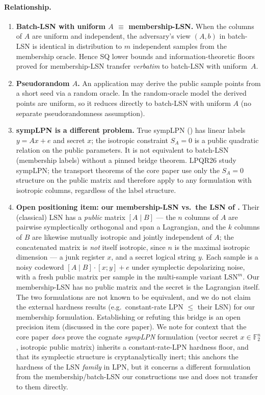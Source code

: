 \documentclass[11pt,a4paper]{article}
\theoremstyle{plain}
\theoremstyle{definition}
\newcommand{\F}{\mathbb{F}}
\begin{document}
\paragraph{Relationship.}
\begin{enumerate}
\item \textbf{Batch-LSN with uniform $A$ $\equiv$ membership-LSN.} When the columns of $A$ are uniform and independent, the adversary's view $(A,b)$ in batch-LSN is identical in distribution to $m$ independent samples from the membership oracle. Hence SQ lower bounds and information-theoretic floors proved for membership-LSN transfer \emph{verbatim} to batch-LSN with uniform~$A$.
\item \textbf{Pseudorandom $A$.} An application may derive the public sample points from a short seed via a random oracle. In the random-oracle model the derived points are uniform, so it reduces directly to batch-LSN with uniform $A$ (no separate pseudorandomness assumption).
\item \textbf{sympLPN is a different problem.} True sympLPN () has linear labels $y = Ax + e$ and secret $x$; the isotropic constraint $S_A = 0$ is a public quadratic relation on the public parameters. It is not equivalent to batch-LSN (membership labels) without a pinned bridge theorem. LPQR26 study sympLPN; the transport theorems of the core paper use only the $S_A = 0$ structure on the public matrix and therefore apply to any formulation with isotropic columns, regardless of the label structure.
\item \textbf{Open positioning item: our membership-LSN vs.\ \linebreak[0] the LSN of \cite{KLP+25,LPQR26}.} Their (classical) LSN has a \emph{public} matrix $[A \mid B]$ --- the $n$ columns of $A$ are pairwise symplectically orthogonal and span a Lagrangian, and the $k$ columns of $B$ are likewise mutually isotropic and jointly independent of $A$; the concatenated matrix is \emph{not} itself isotropic, since $n$ is the maximal isotropic dimension --- a junk register $x$, and a secret logical string $y$. Each sample is a noisy codeword $[A \mid B] \cdot [x; y] + e$ under symplectic depolarizing noise, with a fresh public matrix per sample in the multi-sample variant $\mathrm{LSN}^m$. Our membership-LSN has no public matrix and the secret is the Lagrangian itself. The two formulations are not known to be equivalent, and we do not claim the external hardness results (e.g.\ constant-rate LPN $\le$ their LSN) for our membership formulation. Establishing or refuting this bridge is an open precision item (discussed in the core paper). We note for context that the core paper \emph{does} prove the cognate \emph{sympLPN} formulation (vector secret $x\in\F_2^n$, isotropic public matrix) inherits a constant-rate-LPN hardness floor, and that its symplectic structure is cryptanalytically inert; this anchors the hardness of the LSN \emph{family} in LPN, but it concerns a different formulation from the membership/batch-LSN our constructions use and does not transfer to them directly.
\end{enumerate}
\end{document}
